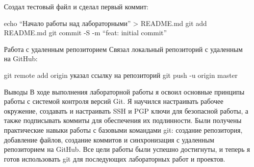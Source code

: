 \documentclass[
]{article}
\begin{document}
Создал тестовый файл и сделал первый коммит:

echo ``Начало работы над лабораторными'' \textgreater{} README.md git
add README.md git commit -S -m ``feat: initial commit''

Работа с удаленным репозиторием Связал локальный репозиторий с удаленным
на GitHub:

git remote add origin указал ссылку на репозиторий git push -u origin
master

Выводы В ходе выполнения лабораторной работы я освоил основные принципы
работы с системой контроля версий Git. Я научился настраивать рабочее
окружение, создавать и настраивать SSH и PGP ключи для безопасной
работы, а также подписывать коммиты для обеспечения их подлинности. Были
получены практические навыки работы с базовыми командами git: создание
репозитория, добавление файлов, создание коммитов и синхронизация с
удаленным репозиторием на GitHub. Все цели работы были успешно
достигнуты, и теперь я готов использовать git для последующих
лабораторных работ и проектов.
\end{document}
